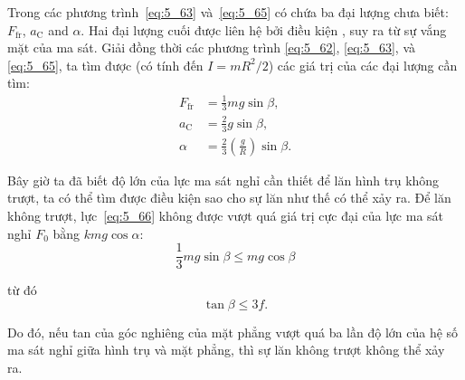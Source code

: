 Trong các phương trình~\eqref{eq:5_63} và~\eqref{eq:5_65} có chứa ba đại lượng chưa biết: $F_{\text{fr}}$, $a_{\text{C}}$ and $\alpha$. Hai đại lượng cuối được liên hệ bởi điều kiện , suy ra từ sự vắng mặt của ma sát. Giải đồng thời các phương trình \eqref{eq:5_62}, \eqref{eq:5_63}, và \eqref{eq:5_65}, ta tìm được (có tính đến $I=mR^2/2$) các giá trị của các đại lượng cần tìm:
\begin{align}
	F_{\text{fr}} &= \frac{1}{3} m g \sin\beta, \label{eq:5_66}\\
	a_{\text{C}} &= \frac{2}{3} g \sin\beta, \label{eq:5_67}\\
	\alpha &= \frac{2}{3}\left(\frac{g}{R}\right)\sin\beta. \label{eq:5_68}
\end{align}

Bây giờ ta đã biết độ lớn của lực ma sát nghỉ cần thiết để lăn hình trụ không trượt, ta có thể tìm được điều kiện sao cho sự lăn như thế có thể xảy ra. Để lăn không trượt, lực~\eqref{eq:5_66} không được vượt quá giá trị cực đại của lực ma sát nghỉ $F_0$ bằng $kmg\cos\alpha$:
\begin{equation*}
	\frac{1}{3} mg\sin\beta \leqslant mg\cos\beta
\end{equation*}

\noindent
từ đó
\begin{equation*}
	\tan\beta \leqslant 3f.
\end{equation*}

\noindent
Do đó, nếu tan của góc nghiêng của mặt phẳng vượt quá ba lần độ lớn của hệ số ma sát nghỉ giữa hình trụ và mặt phẳng, thì sự lăn không trượt không thể xảy ra.

